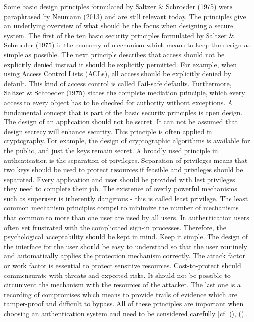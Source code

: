 Some basic design principles formulated by Saltzer \& Schroeder (1975) were paraphrased by Neumann (2013) and are still relevant today. The principles give an underlying overview of what should be the focus when designing a secure system. The first of the ten basic security principles formulated by  Saltzer \& Schroeder (1975) is the economy of mechanism which means to keep the design as simple as possible. The next principle describes that access should not be explicitly denied instead it should be explicitly permitted. For example, when using Access Control Lists (ACLs), all access should be explicitly denied by default. This kind of access control is called Fail-safe defaults.
Furthermore,  Saltzer \& Schroeder (1975) states the complete mediation principle, which every access to every object has to be checked for authority without exceptions. A fundamental concept that is part of the basic security principles is open design. The design of an application should not be secret. It can not be assumed that design secrecy will enhance security. This principle is often applied in cryptography. For example, the design of cryptographic algorithms is available for the public, and just the keys remain secret. A broadly used principle in authentication is the separation of privileges. Separation of privileges means that two keys should be used to protect resources if feasible and privileges should be separated.
Every application and user should be provided with lest privileges they need to complete their job. The existence of overly powerful mechanisms such as superuser is inherently dangerous - this is called least privilege. The least common mechanism principles compel to minimize the number of mechanisms that common to more than one user are used by all users. In authentication users often get frustrated with the complicated sign-in processes. Therefore, the psychological acceptability should be kept in mind. Keep it simple. The design of the interface for the user should be easy to understand so that the user routinely and automatically applies the protection mechanism correctly. The attack factor or work factor is essential to protect sensitive resources. Cost-to-protect should commensurate with threats and expected risks. It should not be possible to circumvent the mechanism with the resources of the attacker.   
The last one is a recording of compromises which means to provide trails of evidence which are tamper-proof and difficult to bypass. All of these principles are important when choosing an authentication system and need to be considered carefully [cf. (\cite{Neumann:2018:PTC}), (\cite{Saltzer:PICS})]. 

